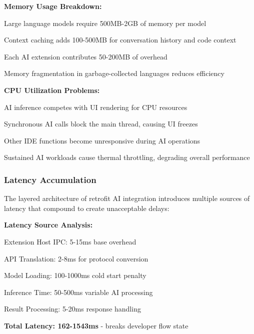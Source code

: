 \textbf{Memory Usage Breakdown:}

\begin{compactlist}
    \item Large language models require 500MB-2GB of memory per model
    \item Context caching adds 100-500MB for conversation history and code context
    \item Each AI extension contributes 50-200MB of overhead
    \item Memory fragmentation in garbage-collected languages reduces efficiency
\end{compactlist}

\textbf{CPU Utilization Problems:}

\begin{compactlist}
    \item AI inference competes with UI rendering for CPU resources
    \item Synchronous AI calls block the main thread, causing UI freezes
    \item Other IDE functions become unresponsive during AI operations
    \item Sustained AI workloads cause thermal throttling, degrading overall performance
\end{compactlist}

\subsubsection{Latency Accumulation}

The layered architecture of retrofit AI integration introduces multiple sources of latency that compound to create unacceptable delays:

\textbf{Latency Source Analysis:}

\begin{compactlist}
    \item Extension Host IPC: 5-15ms base overhead
    \item API Translation: 2-8ms for protocol conversion
    \item Model Loading: 100-1000ms cold start penalty
    \item Inference Time: 50-500ms variable AI processing
    \item Result Processing: 5-20ms response handling
    \item \textbf{Total Latency: 162-1543ms} - breaks developer flow state
\end{compactlist}

